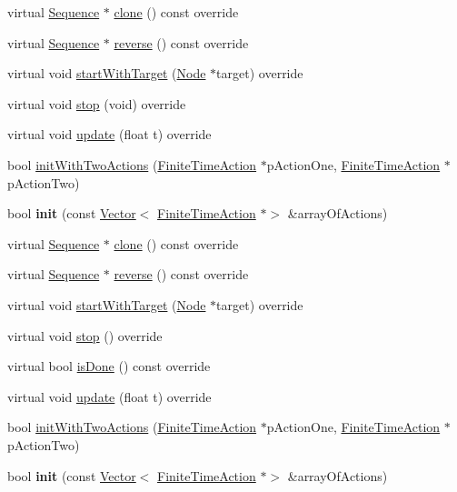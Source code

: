 \begin{DoxyCompactItemize}
\item 
virtual \hyperlink{classSequence}{Sequence} $\ast$ \hyperlink{classSequence_ad6a4cd778ab275e08dfd945efd5a736f}{clone} () const override
\item 
virtual \hyperlink{classSequence}{Sequence} $\ast$ \hyperlink{classSequence_ad637da9eb81e01e9b6535c23220f9221}{reverse} () const override
\item 
virtual void \hyperlink{classSequence_a8da6e287023489db0c5abe888b905697}{start\+With\+Target} (\hyperlink{classNode}{Node} $\ast$target) override
\item 
virtual void \hyperlink{classSequence_a14332cc490ebbbb1c372eff0dc4cd025}{stop} (void) override
\item 
virtual void \hyperlink{classSequence_a336d205df83e1a4ff0ab4ecbc8cf56e3}{update} (float t) override
\item 
bool \hyperlink{classSequence_ae4324a26f6f238fd448ff7261e5f7c5e}{init\+With\+Two\+Actions} (\hyperlink{classFiniteTimeAction}{Finite\+Time\+Action} $\ast$p\+Action\+One, \hyperlink{classFiniteTimeAction}{Finite\+Time\+Action} $\ast$p\+Action\+Two)
\item 
\mbox{\label{classSequence_ab8f25707ca9393932f4d7833e19e7cae}} 
bool {\bfseries init} (const \hyperlink{classVector}{Vector}$<$ \hyperlink{classFiniteTimeAction}{Finite\+Time\+Action} $\ast$$>$ \&array\+Of\+Actions)
\item 
virtual \hyperlink{classSequence}{Sequence} $\ast$ \hyperlink{classSequence_af7a34db8abb86fa6c677e5fa7540f991}{clone} () const override
\item 
virtual \hyperlink{classSequence}{Sequence} $\ast$ \hyperlink{classSequence_ab0d19f0b8c2272921aab829f583a91f0}{reverse} () const override
\item 
virtual void \hyperlink{classSequence_a4d17fdbc7a236a63798e23ae12971b77}{start\+With\+Target} (\hyperlink{classNode}{Node} $\ast$target) override
\item 
virtual void \hyperlink{classSequence_a66d72eff9f99dfff3f0ac09d280f4360}{stop} () override
\item 
virtual bool \hyperlink{classSequence_a2f331fff9e2ab6e63569f55615a1c03e}{is\+Done} () const override
\item 
virtual void \hyperlink{classSequence_a3db260a7840e606c3b3883de4f7b1f48}{update} (float t) override
\item 
bool \hyperlink{classSequence_ae4324a26f6f238fd448ff7261e5f7c5e}{init\+With\+Two\+Actions} (\hyperlink{classFiniteTimeAction}{Finite\+Time\+Action} $\ast$p\+Action\+One, \hyperlink{classFiniteTimeAction}{Finite\+Time\+Action} $\ast$p\+Action\+Two)
\item 
\mbox{\label{classSequence_ab8f25707ca9393932f4d7833e19e7cae}} 
bool {\bfseries init} (const \hyperlink{classVector}{Vector}$<$ \hyperlink{classFiniteTimeAction}{Finite\+Time\+Action} $\ast$$>$ \&array\+Of\+Actions)
\end{DoxyCompactItemize}
